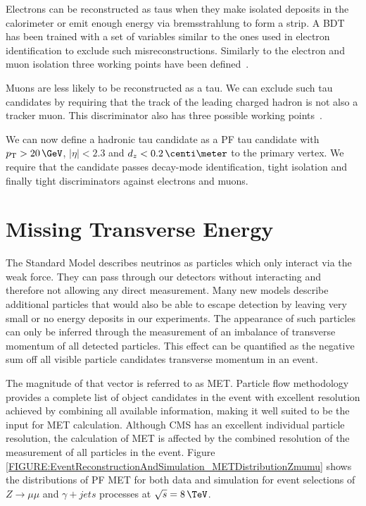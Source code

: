 Electrons can be reconstructed as taus when they make isolated deposits in the calorimeter or emit enough energy via bremsstrahlung to form a strip. A \gls{BDT} has been trained with a set of variables similar to the ones used in electron identification to exclude such misreconstructions. Similarly to the electron and muon isolation three working points have been defined~\cite{ARTICLE:CMSPerformaceOfTauLeptonReconstruction,ARTICLE:CMSReconstructionIndentificationTau}. 

Muons are less likely to be reconstructed as a tau. We can exclude such tau candidates by requiring that the track of the leading charged hadron is not also a tracker muon. This discriminator also has three possible working points~\cite{ARTICLE:CMSPerformaceOfTauLeptonReconstruction,ARTICLE:CMSReconstructionIndentificationTau}.

We can now define a hadronic tau candidate as a \gls{PF} tau candidate with $\pt > 20 \,\GeV$, $|\eta|<2.3$ and $d_z<0.2 \,\centi\meter$ to the primary vertex. We require that the candidate passes decay-mode identification, tight isolation and finally tight discriminators against electrons and muons.

\section{Missing Transverse Energy}
\label{SECTION:EventReconstructionAndSimulation_MET}


The Standard Model describes neutrinos as particles which only interact via the weak force. They can pass through our detectors without interacting and therefore not allowing any direct measurement. Many new models describe additional particles that would also be able to escape detection by leaving very small or no energy deposits in our experiments. The appearance of such particles can only be inferred through the measurement of an imbalance of transverse momentum of all detected particles. This effect can be quantified as the negative sum off all visible particle candidates transverse momentum in an event. 

The magnitude of that vector is referred to as \acrfull{MET}. Particle flow methodology provides a complete list of object candidates in the event with excellent resolution achieved by combining all available information, making it well suited to be the input for \gls{MET} calculation. Although \gls{CMS} has an excellent individual particle resolution, the calculation of \gls{MET} is affected by the combined resolution of the measurement of all particles in the event. Figure \ref{FIGURE:EventReconstructionAndSimulation_METDistributionZmumu} shows the distributions of \gls{PF} \gls{MET} for both data and simulation for event selections of $Z \rightarrow \mu\mu$ and $\gamma +jets$ processes at $\sqrt{s}=8\,\TeV$. 

